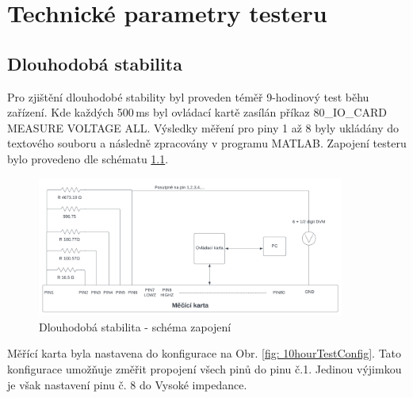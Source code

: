 \chapter{Technické parametry testeru} \label{tehcnical parameters}
\section{Dlouhodobá stabilita}
Pro zjištění dlouhodobé stability byl proveden téměř 9-hodinový test běhu zařízení. Kde
každých 500\,ms byl ovládací kartě zasílán příkaz 80\_IO\_CARD MEASURE VOLTAGE ALL.
Výsledky měření pro piny 1 až 8 byly ukládány do textového souboru a následně zpracovány v programu MATLAB.
Zapojení testeru bylo provedeno dle schématu \ref{fig: 10hourTestScheme}.

\begin{figure}[ht!]
    \centering
    \includegraphics[width = 0.9\textwidth]{obrazky/10hourTestScheme.png}
    \caption{Dlouhodobá stabilita - schéma zapojení}
    \label{fig: 10hourTestScheme}
\end{figure}

Měřící karta byla nastavena do konfigurace na Obr. \ref{fig: 10hourTestConfig}. Tato konfigurace
umožňuje změřit propojení všech pinů do pinu č.1. Jedinou výjimkou je však nastavení pinu č. 8 do Vysoké impedance.

